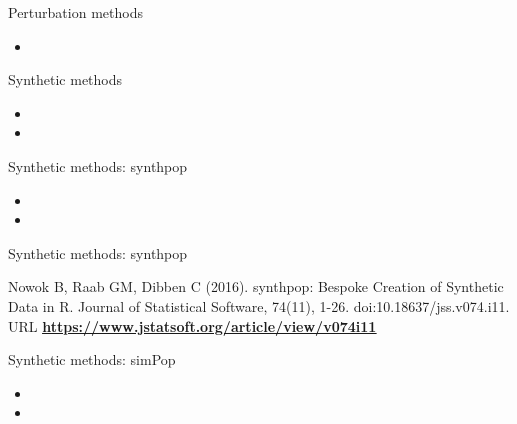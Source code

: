 \documentclass[
	aspectratio = 169
 ]{beamer}
\begin{document}
\begin{frame}{Perturbation methods}

\begin{itemize}
\item
  \color{red}{sdcMicro}
\end{itemize}
\end{frame}

\begin{frame}{Synthetic methods}

\begin{itemize}
\item
  \color{red}{Introduction to synthetic data}
\item
  \Huge \color{red}{for Jiri/Oscar}
\end{itemize}
\end{frame}

\begin{frame}{Synthetic methods: synthpop}

\begin{itemize}
\item
  \color{red}{Generating synthetic data with synthpop}
\item
  \Huge \color{red}{for Jiri/Oscar}
\end{itemize}
\end{frame}

\begin{frame}{Synthetic methods: synthpop}

Nowok B, Raab GM, Dibben C (2016). synthpop: Bespoke Creation of
Synthetic Data in R. Journal of Statistical Software, 74(11), 1-26.
doi:10.18637/jss.v074.i11. URL
\href{https://www.jstatsoft.org/article/view/v074i11}{\color{blue}\underline{\textbf{https://www.jstatsoft.org/article/view/v074i11}}}
\end{frame}

\begin{frame}{Synthetic methods: simPop}

\begin{itemize}
\item
  \color{red}{Generating synthetic data with simPop}
\item
  \Huge \color{red}{for Jiri/Oscar}
\end{itemize}
\end{frame}
\end{document}
